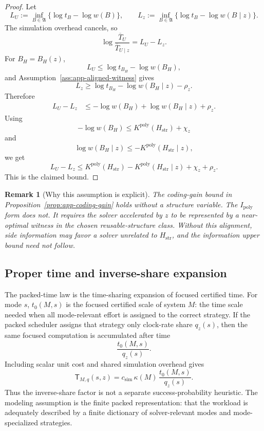 \documentclass{article}
\newtheorem{remark}{Remark}
\begin{document}
\begin{proof}
Let
\[
    L_U:=\inf_{B\in\mathfrak A}\{\log t_B-\log w(B)\},
    \qquad
    L_z:=\inf_{B\in\mathfrak A}\{\log t_B-\log w(B\mid z)\}.
\]
The simulation overhead cancels, so
\[
    \log\frac{\overline T_U}{\overline T_{U\mid z}}
    =
    L_U-L_z.
\]
For \(B_H=B_H(z)\),
\[
    L_U
    \le
    \log t_{B_H}-\log w(B_H),
\]
and Assumption~\ref{ass:app-aligned-witness} gives
\[
    L_z
    \ge
    \log t_{B_H}-\log w(B_H\mid z)-\rho_z.
\]
Therefore
\[
\begin{aligned}
    L_U-L_z
    &\le
    -\log w(B_H)+\log w(B_H\mid z)+\rho_z.
\end{aligned}
\]
Using
\[
    -\log w(B_H)
    \le
    K^{\mathrm{poly}}(H_{\mathrm{str}})+\chi_z
\]
and
\[
    \log w(B_H\mid z)
    \le
    -K^{\mathrm{poly}}(H_{\mathrm{str}}\mid z),
\]
we get
\[
    L_U-L_z
    \le
    K^{\mathrm{poly}}(H_{\mathrm{str}})
    -
    K^{\mathrm{poly}}(H_{\mathrm{str}}\mid z)
    +
    \chi_z+\rho_z.
\]
This is the claimed bound.
\end{proof}

\begin{remark}[Why this assumption is explicit]
The coding-gain bound in Proposition~\ref{prop:app-coding-gain} holds without a structure
variable.  The \(I_{\mathrm{poly}}\) form does not.  It requires the solver accelerated by
\(z\) to be represented by a near-optimal witness in the chosen reusable-structure class.
Without this alignment, side information may favor a solver unrelated to
\(H_{\mathrm{str}}\), and the information upper bound need not follow.
\end{remark}

\subsection{Proper time and inverse-share expansion}
\label{app:proper-time-inverse-share}

The packed-time law is the time-sharing expansion of focused certified time.
For mode \(s\), \(t_0(M,s)\) is the focused certified scale of system \(M\): the time
scale needed when all mode-relevant effort is assigned to the correct strategy.
If the packed scheduler assigns that strategy only clock-rate share \(q_z(s)\), then the
same focused computation is accumulated after time
\[
    \frac{t_0(M,s)}{q_z(s)}.
\]
Including scalar unit cost and shared simulation overhead gives
\[
    \mathsf T_{M,q}(s,z)
    =
    c_{\mathrm{sim}}\,
    \kappa(M)\,
    \frac{t_0(M,s)}{q_z(s)}.
\]
Thus the inverse-share factor is not a separate success-probability heuristic.
The modeling assumption is the finite packed representation: that the workload is
adequately described by a finite dictionary of solver-relevant modes and mode-specialized
strategies.
\end{document}
